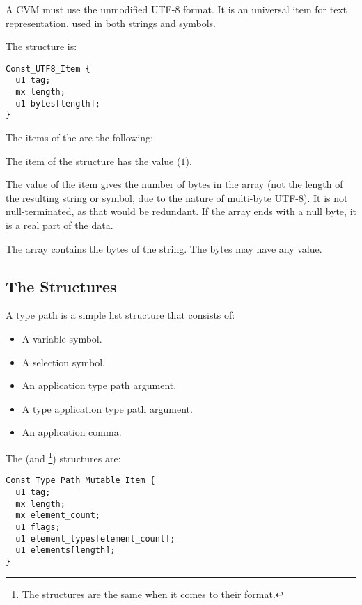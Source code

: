 A CVM must use the unmodified UTF-8 format. It is an universal item for text representation, used in both strings and symbols. 

The  structure is:
\begin{lstlisting}
Const_UTF8_Item {
  u1 tag;
  mx length;
  u1 bytes[length];
}
\end{lstlisting}

The items of the  are the following:
\begin{description}[font=\ttfamily\mdseries,style=nextline]
  \item[tag]
  The  item of the  structure has the value  ($1$). 
  \item[length]
  The value of the  item gives the number of bytes in the  array (not the length of the resulting string or symbol, due to the nature of multi-byte \mbox{UTF-8}). It is not null-terminated, as that would be redundant. If the array ends with a null byte, it is a real part of the data. 
  \item[bytes]
  The  array contains the bytes of the string. The bytes may have any value. 
\end{description}





\subsection{The  Structures}

A type path is a simple list structure that consists of: 
\begin{itemize}
  \item A variable symbol. 
  \item A selection symbol. 
  \item An application type path argument. 
  \item A type application type path argument. 
  \item An application comma.
\end{itemize}

The  (and \footnote{The structures are the same when it comes to their format.}) structures are:
\begin{lstlisting}
Const_Type_Path_Mutable_Item {
  u1 tag;
  mx length;
  mx element_count;
  u1 flags;
  u1 element_types[element_count];
  u1 elements[length];
}
\end{lstlisting}

